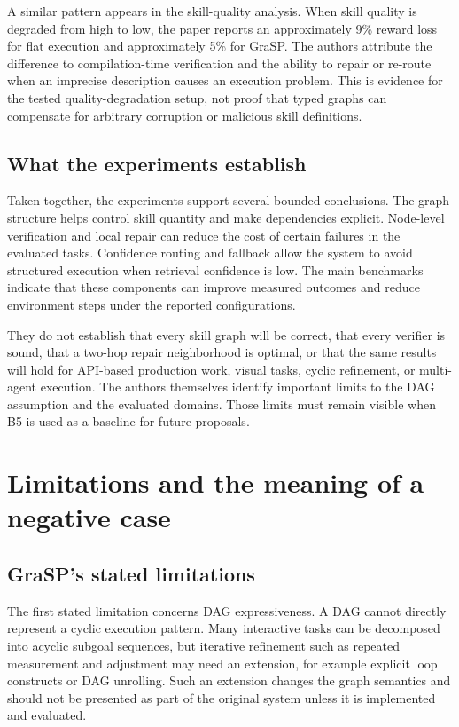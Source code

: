 A similar pattern appears in the skill-quality analysis. When skill quality is degraded from high to low, the paper reports an approximately 9\% reward loss for flat execution and approximately 5\% for GraSP. The authors attribute the difference to compilation-time verification and the ability to repair or re-route when an imprecise description causes an execution problem. This is evidence for the tested quality-degradation setup, not proof that typed graphs can compensate for arbitrary corruption or malicious skill definitions.

\subsection{What the experiments establish}

Taken together, the experiments support several bounded conclusions. The graph structure helps control skill quantity and make dependencies explicit. Node-level verification and local repair can reduce the cost of certain failures in the evaluated tasks. Confidence routing and fallback allow the system to avoid structured execution when retrieval confidence is low. The main benchmarks indicate that these components can improve measured outcomes and reduce environment steps under the reported configurations.\autocite{xia2026grasp}

They do not establish that every skill graph will be correct, that every verifier is sound, that a two-hop repair neighborhood is optimal, or that the same results will hold for API-based production work, visual tasks, cyclic refinement, or multi-agent execution. The authors themselves identify important limits to the DAG assumption and the evaluated domains. Those limits must remain visible when B5 is used as a baseline for future proposals.

\section{Limitations and the meaning of a negative case}
\label{sec:ch17-limitations-negative-case}

\subsection{GraSP's stated limitations}

The first stated limitation concerns DAG expressiveness. A DAG cannot directly represent a cyclic execution pattern. Many interactive tasks can be decomposed into acyclic subgoal sequences, but iterative refinement such as repeated measurement and adjustment may need an extension, for example explicit loop constructs or DAG unrolling. Such an extension changes the graph semantics and should not be presented as part of the original system unless it is implemented and evaluated.\autocite{xia2026grasp}

